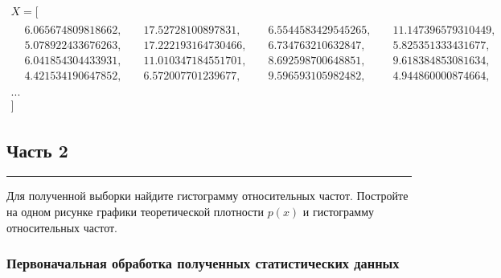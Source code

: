 \documentclass[a4paper, 14pt]{extarticle}
\begin{document}
\noindent
\begin{adjustbox}{max width=1\textwidth}
  \parbox{\linewidth}{%
    \begin{gather*}
      X = [ \\
      \begin{aligned}
        & 6.065674809818662, & \hspace{3pt} & 17.52728100897831,  & \hspace{3pt} & 6.5544583429545265, & \hspace{3pt} & 11.147396579310449, & \\ 
        & 5.078922433676263, & \hspace{3pt} & 17.222193164730466, & \hspace{3pt} & 6.734763210632847,  & \hspace{3pt} & 5.825351333431677,  & \\
        & 6.041854304433931, & \hspace{3pt} & 11.010347184551701, & \hspace{3pt} & 8.692598700648851,  & \hspace{3pt} & 9.618384853081634,  & \\
        & 4.421534190647852, & \hspace{3pt} & 6.572007701239677,  & \hspace{3pt} & 9.596593105982482,  & \hspace{3pt} & 4.944860000874664,  & \\
      \end{aligned} \\
      ...\\
      ]
    \end{gather*}
  }
\end{adjustbox}

\subsection{Часть 2}\vspace{-20pt}\rule{\linewidth}{0.1mm}

Для полученной выборки найдите гистограмму относительных частот. 
Постройте на одном рисунке графики теоретической плотности $p(x)$ и 
гистограмму относительных частот.

\subsubsection{Первоначальная обработка полученных статистических данных}
\end{document}
